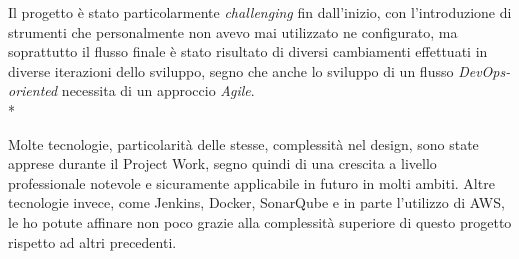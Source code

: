 \documentclass[../main.tex]{subfiles}
\begin{document}
	    Il progetto è stato particolarmente \emph{challenging} fin dall'inizio, con l'introduzione di strumenti che personalmente non avevo mai utilizzato ne configurato, ma soprattutto il flusso finale è stato risultato di diversi cambiamenti effettuati in diverse iterazioni dello sviluppo, segno che anche lo sviluppo di un flusso \emph{DevOps-oriented} necessita di un approccio \emph{Agile}.\\*
	    
	    Molte tecnologie, particolarità delle stesse, complessità nel design, sono state apprese durante il Project Work, segno quindi di una crescita a livello professionale notevole e sicuramente applicabile in futuro in molti ambiti. Altre tecnologie invece, come Jenkins, Docker, SonarQube e in parte l'utilizzo di AWS, le ho potute affinare non poco grazie alla complessità superiore di questo progetto rispetto ad altri precedenti.
\end{document}
